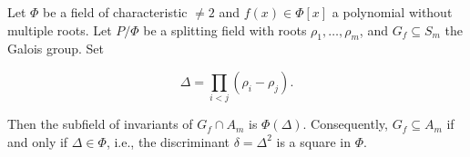 Let $\Phi$ be a field of characteristic $\neq 2$ and $f(x) \in \Phi[x]$ a polynomial without multiple roots. Let $P/\Phi$ be a splitting field with roots $\rho_1, \dots, \rho_m$, and $G_f \subseteq S_m$ the Galois group. Set

$$\Delta = \prod_{i < j} (\rho_i - \rho_j).$$

Then the subfield of invariants of $G_f \cap A_m$ is $\Phi(\Delta)$. Consequently, $G_f \subseteq A_m$ if and only if $\Delta \in \Phi$, i.e., the discriminant $\delta = \Delta^2$ is a square in $\Phi$.
